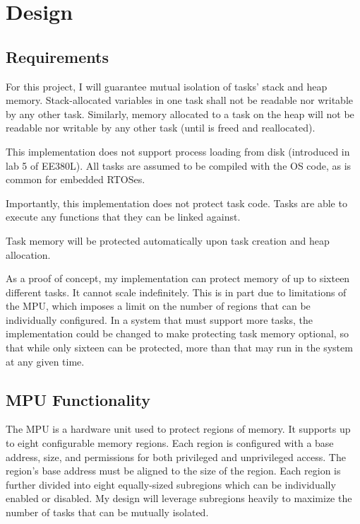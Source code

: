 
\chapter{Design}

\section{Requirements}

For this project, I will guarantee mutual isolation of tasks' stack and heap memory. Stack-allocated variables in one task shall not be readable nor writable by any other task. Similarly, memory allocated to a task on the heap will not be readable nor writable by any other task (until is freed and reallocated).

This implementation does not support process loading from disk (introduced in lab 5 of EE380L). All tasks are assumed to be compiled with the OS code, as is common for embedded RTOSes.

Importantly, this implementation does not protect task code. Tasks are able to execute any functions that they can be linked against.

Task memory will be protected automatically upon task creation and heap allocation.

As a proof of concept, my implementation can protect memory of up to sixteen different tasks. It cannot scale indefinitely. This is in part due to limitations of the MPU, which imposes a limit on the number of regions that can be individually configured. In a system that must support more tasks, the implementation could be changed to make protecting task memory optional, so that while only sixteen can be protected, more than that may run in the system at any given time.

\section{MPU Functionality}

The MPU is a hardware unit used to protect regions of memory. It supports up to eight configurable memory regions. Each region is configured with a base address, size, and permissions for both privileged and unprivileged access. The region's base address must be aligned to the size of the region. Each region is further divided into eight equally-sized subregions which can be individually enabled or disabled. My design will leverage subregions heavily to maximize the number of tasks that can be mutually isolated.

